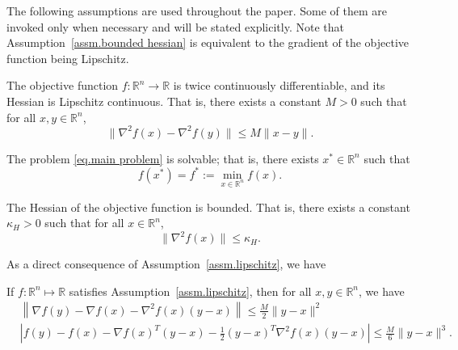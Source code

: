 \documentclass{article}
\begin{document}
The following assumptions are used throughout the paper. Some of them are invoked only when necessary and will be stated explicitly. Note that Assumption~\ref{assm.bounded hessian} is equivalent to the gradient of the objective function being Lipschitz.
\begin{assumption}
    \label{assm.lipschitz}
    The objective function $f: \mathbb{R}^n \to \mathbb{R}$ is twice continuously differentiable, and its Hessian is Lipschitz continuous. That is, there exists a constant $M > 0$ such that for all $x, y \in \mathbb{R}^n$,
    \begin{equation}
        \label{eq.main assm}
        \|\nabla^2 f(x) - \nabla^2 f(y)\| \leq M \|x - y\|. \end{equation}
\end{assumption}
\begin{assumption}
    \label{assm.solvable}
    The problem \eqref{eq.main problem} is solvable; that is, there exists $x^* \in \mathbb{R}^n$ such that
    \begin{equation*}
        f(x^*) = f^*:= \min_{x \in \mathbb{R}^n} f(x).
    \end{equation*}
\end{assumption}
\begin{assumption}
    \label{assm.bounded hessian}
    The Hessian of the objective function is bounded. That is, there exists a constant $\kappa_H > 0$ such that for all $x \in \mathbb{R}^n$, \begin{equation}
        \label{eq.bounded hessian}
        \|\nabla^2 f(x)\| \leq \kappa_H.
    \end{equation}
\end{assumption}
As a direct consequence of Assumption~\ref{assm.lipschitz}, we have
\begin{lemma}\label{lem.lipschitz}
    If \(f:\mathbb{R}^n \mapsto \mathbb{R}\) satisfies Assumption~\ref{assm.lipschitz}, then for all \(x,y\in \mathbb{R}^n\), we have
    \begin{subequations}
        \begin{align}
            \label{eq.first-order exp}
             & \left\|\nabla f(y)-\nabla f(x)-\nabla^{2} f(x)(y-x)\right\|                       \leq \frac{M}{2}\|y-x\|^{2}  \\
            \label{eq.second-order exp}
             & \left|f(y)-f(x)-\nabla f(x)^T(y-x)-\frac{1}{2}(y-x)^T\nabla^{2} f(x)(y-x)\right|  \leq \frac{M}{6}\|y-x\|^{3}.
        \end{align}
    \end{subequations}
\end{lemma}
\end{document}
